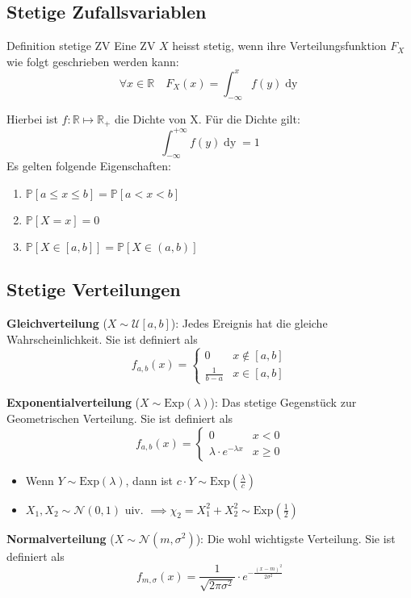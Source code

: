 \documentclass[a4paper,10pt]{article}
\def\R{\mathbb{R}}
\def\P{\mathbb{P}}
\begin{document}
\subsection{Stetige Zufallsvariablen}
\begin{subbox}{Definition stetige ZV}
	Eine ZV \(X\) heisst stetig, wenn ihre Verteilungsfunktion \(F_X\) wie folgt geschrieben werden kann:
	\[\forall x \in \R \quad F_X(x) = \int_{-\infty}^x f(y) \mathop{dy}\]
\end{subbox}
Hierbei ist \(f: \R \mapsto \R_+\) die Dichte von X. Für die Dichte gilt:
\[\int_{-\infty}^{+\infty}f(y) \mathop{dy} = 1\]
Es gelten folgende Eigenschaften:
\begin{enumerate}
	\item \(\P[a \le x \le b] = \P[a < x < b]\)
	\item \(\P[X=x] = 0\)
	\item \(\P[X \in [a,b]] = \P[X \in (a,b)]\)
\end{enumerate}

\subsection{Stetige Verteilungen}
\textbf{Gleichverteilung} (\(X \sim \mathcal{U}[a,b]\)): Jedes Ereignis hat die gleiche Wahrscheinlichkeit. Sie ist definiert als
\[f_{a,b}(x) = \begin{cases}
		0             & x \notin [a,b] \\
		\frac{1}{b-a} & x \in [a,b]
	\end{cases}\]

\noindent \textbf{Exponentialverteilung} (\(X \sim \text{Exp}(\lambda)\)): Das stetige Gegenstück zur Geometrischen Verteilung. Sie ist definiert als
\[f_{a,b}(x) = \begin{cases}
		0                            & x < 0    \\
		\lambda \cdot e^{-\lambda x} & x \geq 0
	\end{cases}\]
\begin{itemize}
	\item Wenn \(Y\sim \text{Exp}(\lambda)\), dann ist \(c \cdot Y \sim \text{Exp}(\frac{\lambda}{c})\)
	\item \(X_1, X_2 \sim \mathcal{N}(0,1)\) uiv. \(\implies \chi_2 = X_1^2 +X_2^2 \sim \text{Exp}(\frac{1}{2})\)
\end{itemize}

\noindent \textbf{Normalverteilung} (\(X \sim \mathcal{N}(m, \sigma^2)\)): Die wohl wichtigste Verteilung. Sie ist definiert als
\[f_{m, \sigma}(x) = \frac{1}{\sqrt{2 \pi \sigma^2}} \cdot e^{-\frac{(x-m)^2}{2 \sigma^2}}\]
\end{document}
